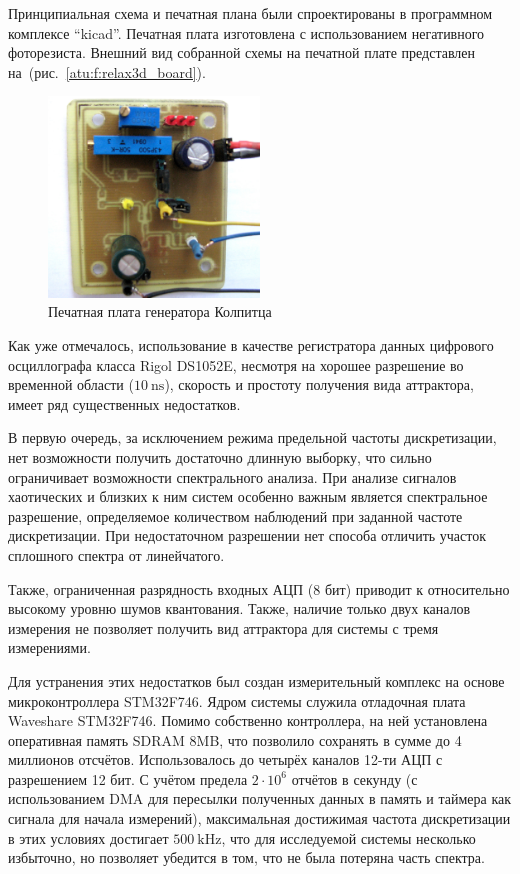 Принципиальная схема и печатная плана были спроектированы в
программном комплексе ``kicad''. %
Печатная плата изготовлена с использованием негативного фоторезиста.
Внешний вид собранной схемы на печатной плате представлен на~(рис.~\ref{atu:f:relax3d_board}).

\begin{figure}[htb!]
\centerline{\includegraphics[width=0.5\textwidth]{p/colp_board.jpg} }
\caption{Печатная плата генератора Колпитца}
\label{atu:f:colp_board}
\end{figure}


Как уже отмечалось, использование в качестве регистратора данных
цифрового осциллографа класса Rigol DS1052E,
несмотря на  хорошее разрешение во временной области ($\SI{10}{\nano\second}$),
скорость и простоту получения вида аттрактора,
имеет ряд существенных недостатков.

В первую очередь, за исключением режима предельной частоты дискретизации,
нет возможности получить достаточно длинную выборку, что
сильно ограничивает возможности спектрального анализа.
При анализе сигналов хаотических и близких к ним систем
особенно важным является спектральное разрешение,
определяемое количеством наблюдений при заданной частоте дискретизации.
При недостаточном разрешении нет способа отличить участок сплошного спектра
от линейчатого.

Также, ограниченная разрядность входных АЦП (8 бит)
приводит к относительно высокому уровню шумов квантования.
Также, наличие только двух каналов измерения не позволяет
получить вид аттрактора для системы с тремя измерениями.

Для устранения этих недостатков был создан
измерительный комплекс на основе
микроконтроллера STM32F746.
Ядром системы служила отладочная плата Waveshare STM32F746.
Помимо собственно контроллера, на ней установлена оперативная память
SDRAM 8MB, что позволило сохранять в сумме до 4 миллионов отсчётов.
Использовалось до четырёх каналов 12-ти АЦП с разрешением 12 бит.
С учётом предела $2 \cdot 10^6$ отчётов в секунду
(с использованием DMA для пересылки полученных данных в память и таймера как сигнала для начала измерений),
максимальная достижимая частота дискретизации в этих условиях достигает $\SI{500}{\kilo\hertz}$,
что для исследуемой системы несколько избыточно,
но позволяет убедится в том, что не была потеряна часть спектра.

